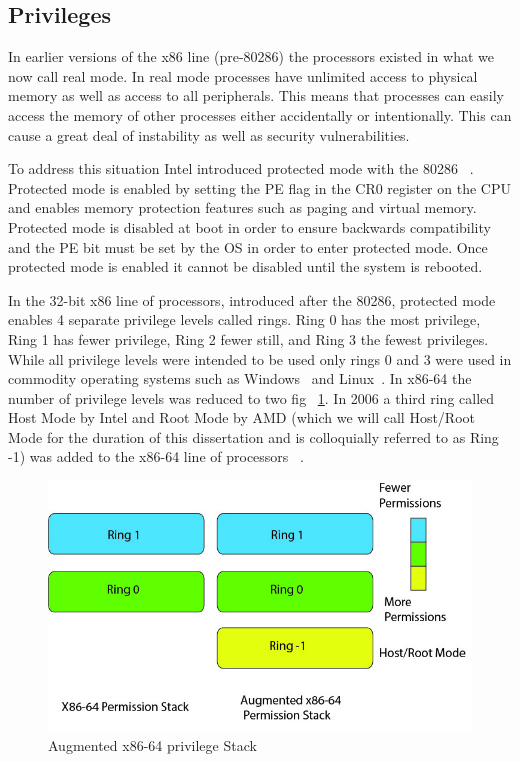 \subsection{Privileges}

In earlier versions of the x86 line (pre-80286) the processors existed in what we now call real mode. In real mode processes have unlimited access to physical memory as well as access to all peripherals. This means that processes can easily access the memory of other processes either accidentally or intentionally. This can cause a great deal of instability as well as security vulnerabilities. 

To address this situation Intel introduced protected mode with the 80286 ~\cite{_iapx_1983}. Protected mode is enabled by setting the PE flag in the CR0 register on the CPU and enables memory protection features such as paging and virtual memory. Protected mode is disabled at boot in order to ensure backwards compatibility and the PE bit must be set by the OS in order to enter protected mode. Once protected mode is enabled it cannot be disabled until the system is rebooted. 


In the 32-bit x86 line of processors, introduced after the 80286, protected mode enables 4 separate privilege levels called rings. Ring 0 has the most privilege, Ring 1 has fewer privilege, Ring 2 fewer still, and Ring 3 the fewest privileges. While all privilege levels were intended to be used only rings 0 and 3 were used in commodity operating systems such as Windows~\cite{_microsoft_2014} and Linux~\cite{_Linux_archive}. In x86-64 the number of privilege levels was reduced to two fig ~\ref{PermStack}. In 2006 a third ring called Host Mode by Intel and Root Mode by AMD (which we will call Host/Root Mode for the duration of this dissertation and is colloquially referred to as Ring -1) was added to the x86-64 line of processors ~\cite{codenamed_pacifica_2005}. 



\begin{figure}\label{PermStack}
	  \centering
	  \includegraphics[width=\textwidth]{figures/AugmentedPerm.jpg}
	  \caption{Augmented x86-64 privilege Stack}
\end{figure}

